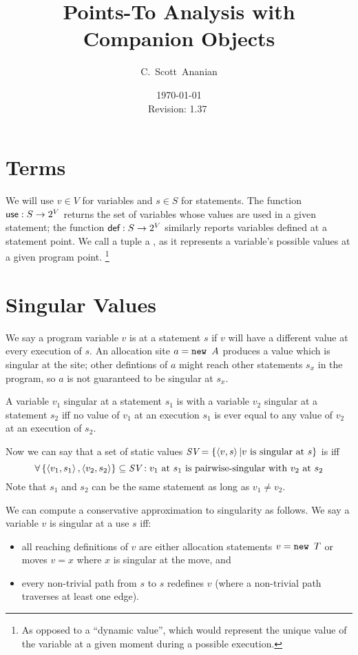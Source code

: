 \documentclass[11pt,notitlepage]{article}
\author{C.~Scott~Ananian}
\title{Points-To Analysis with Companion Objects}
\date{\today \\ $ $Revision: 1.37 $ $}
\newcommand{\bigvar}[1]{\ensuremath{\text{\it #1}}}
\newcommand{\func}[1]{\ensuremath{\text{\sffamily #1}}}
\begin{document}

\maketitle
\section{Terms} %
We will use $v\in V$ for variables and $s\in S$ for statements.  The
function $\func{use}:S\to 2^V$ returns the set of variables whose
values are used in a given statement; the function $\func{def}:S\to
2^V$ similarly reports variables defined at a statement point.
We call a tuple  a , as it represents
a variable's possible values at a given program point.%
\footnote{As opposed to a ``dynamic value'', which would represent the
  unique value of the variable at a given moment during a possible execution.}

\section{Singular Values}

We say a program variable $v$ is  at a statement $s$
if $v$ will have a different value at every execution of $s$.  An
allocation site $a = \text{\tt new }A$ produces a value which is singular
at the site; other defintions of $a$ might reach other statements
$s_x$ in the program, so $a$ is not guaranteed to be singular at $s_x$.

A variable $v_1$ singular at a statement $s_1$ is
 with a variable $v_2$ singular at a statement
$s_2$ iff no value of $v_1$ at an execution $s_1$ is ever equal to any
value of $v_2$ at an execution of $s_2$.

Now we can say that a set of static values
$\bigvar{SV}=\left\{ \tuple{v,s} | v \text{ is singular at } s \right\}$
is
 iff
\begin{displaymath}
\forall \left\{ \tuple{v_1,s_1}, \tuple{v_2,s_2} \right\} \subseteq
        \bigvar{SV} :
v_1 \text{ at } s_1 \text{ is pairwise-singular with } v_2 \text{ at } s_2
\end{displaymath}
Note that $s_1$ and $s_2$ can be the same statement as long as $v_1\neq v_2$.

We can compute a conservative approximation to singularity as follows.
We say a variable $v$ is singular at a use $s$ iff:
\begin{itemize}
\item all reaching definitions of $v$ are either allocation statements 
$v = \text{\tt new }T$ or moves $v = x$ where $x$ is singular at
the move, and
\item every non-trivial path from $s$ to $s$ redefines $v$ (where a
  non-trivial path traverses at least one edge).
\end{itemize}
\end{document}

